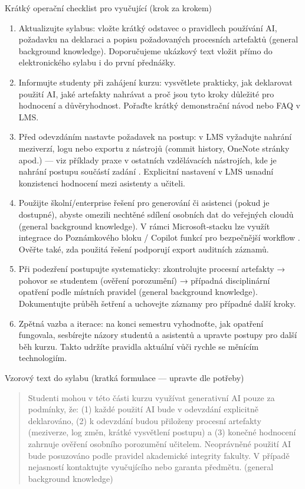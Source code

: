 \documentclass{report}%
\begin{document}
Krátký operační checklist pro vyučující (krok za krokem)
\begin{enumerate}
  \item Aktualizujte sylabus: vložte krátký odstavec o pravidlech používání AI, požadavku na deklaraci a popisu požadovaných procesních artefaktů (general background knowledge). Doporučujeme ukázkový text vložit přímo do elektronického sylabu i do první přednášky.
  \item Informujte studenty při zahájení kurzu: vysvětlete prakticky, jak deklarovat použití AI, jaké artefakty nahrávat a proč jsou tyto kroky důležité pro hodnocení a důvěryhodnost. Pořaďte krátký demonstrační návod nebo FAQ v LMS.
  \item Před odevzdáním nastavte požadavek na postup: v LMS vyžadujte nahrání meziverzí, logu nebo exportu z nástrojů (commit history, OneNote stránky apod.) — viz příklady praxe v ostatních vzdělávacích nástrojích, kde je nahrání postupu součástí zadání \cite{kb_ai_101_tipu_pdf_04e4a115_page_8_1}. Explicitní nastavení v LMS usnadní konzistenci hodnocení mezi asistenty a učiteli.
  \item Použijte školní/enterprise řešení pro generování či asistenci (pokud je dostupné), abyste omezili nechtěné sdílení osobních dat do veřejných cloudů (general background knowledge). V rámci Microsoft‑stacku lze využít integrace do Poznámkového bloku / Copilot funkcí pro bezpečnější workflow \cite{kb_ai_101_tipu_pdf_04e4a115_page_14_1}. Ověřte také, zda použitá řešení podporují export auditních záznamů.
  \item Při podezření postupujte systematicky: zkontrolujte procesní artefakty → pohovor se studentem (ověření porozumění) → případná disciplinární opatření podle místních pravidel (general background knowledge). Dokumentujte průběh šetření a uchovejte záznamy pro případné další kroky.
  \item Zpětná vazba a iterace: na konci semestru vyhodnoťte, jak opatření fungovala, sesbírejte názory studentů a asistentů a upravte postupy pro další běh kurzu. Takto udržíte pravidla aktuální vůči rychle se měnícím technologiím.
\end{enumerate}

Vzorový text do sylabu (kratká formulace — upravte dle potřeby)
\begin{quote}
Studenti mohou v této části kurzu využívat generativní AI pouze za podmínky, že: (1) každé použití AI bude v odevzdání explicitně deklarováno, (2) k odevzdání budou přiloženy procesní artefakty (meziverze, log změn, krátké vysvětlení postupu) a (3) konečné hodnocení zahrnuje ověření osobního porozumění učitelem. Neoprávněné použití AI bude posuzováno podle pravidel akademické integrity fakulty. V případě nejasností kontaktujte vyučujícího nebo garanta předmětu. (general background knowledge)
\end{quote}
\end{document}
